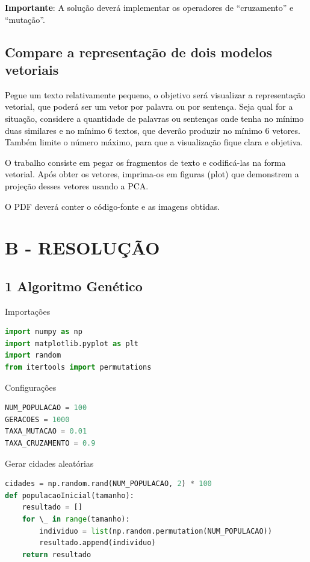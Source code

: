 \textbf{\textcolor{black}{Importante}}\textcolor{black}{: A solução deverá implementar os operadores de “cruzamento” e
“mutação”.}


\subsection{Compare a representação de dois modelos vetoriais}


\textcolor{black}{Pegue um texto relativamente pequeno, o objetivo será visualizar a representação vetorial, que poderá
ser um vetor por palavra ou por sentença. Seja qual for a situação, considere a quantidade de palavras ou sentenças
onde tenha no mínimo duas similares e no mínimo 6 textos, que deverão produzir no mínimo 6 vetores. Também limite o
número máximo, para que a visualização fique clara e objetiva.}


\textcolor{black}{O trabalho consiste em pegar os fragmentos de texto e codificá-las na forma vetorial. Após obter os
vetores, imprima-os em figuras (plot) que demonstrem a projeção desses vetores usando a PCA.}


\textcolor{black}{O PDF deverá conter o código-fonte e as imagens obtidas.}


\section*{\textbf{B - RESOLUÇÃO}}


\subsection{1 Algoritmo Genético}

Importações

\begin{lstlisting}[language=Python, style=input]
import numpy as np
import matplotlib.pyplot as plt
import random
from itertools import permutations
\end{lstlisting}

Configurações

\begin{lstlisting}[language=Python, style=input]
NUM_POPULACAO = 100
GERACOES = 1000
TAXA_MUTACAO = 0.01
TAXA_CRUZAMENTO = 0.9
\end{lstlisting}

Gerar cidades aleatórias

\begin{lstlisting}[language=Python, style=input]
cidades = np.random.rand(NUM_POPULACAO, 2) * 100
def populacaoInicial(tamanho): 
    resultado = [] 
    for \_ in range(tamanho): 
        individuo = list(np.random.permutation(NUM_POPULACAO)) 
        resultado.append(individuo) 
    return resultado
\end{lstlisting}

